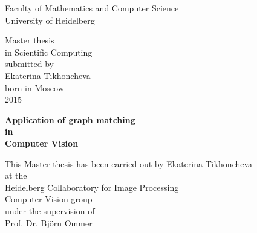\version
\thispagestyle{empty}
\begin{center}
  \renewcommand{\baselinestretch}{2.00}
  \Large %
  Faculty of Mathematics and Computer Science\\
  \large University of Heidelberg
  \par\vfill\normalfont
  Master thesis\\
  in Scientific Computing\\
  submitted by\\
  Ekaterina Tikhoncheva\\
  born in Moscow\\
  2015
\end{center}
\newpage

\thispagestyle{empty}
\begin{center}
  \renewcommand{\baselinestretch}{2.00}
  \Large\bfseries %
    Application of graph matching\\
    in\\
    Computer Vision
  \par
  \vfill
  \large\normalfont
  This Master thesis has been carried out by Ekaterina Tikhoncheva\\
  at the\\
  Heidelberg Collaboratory for Image Processing\\
  Computer Vision group\\
  under the supervision of\\
  Prof. Dr. Björn Ommer
\end{center}\par
\vspace{5\baselineskip}

\onehalfspacing